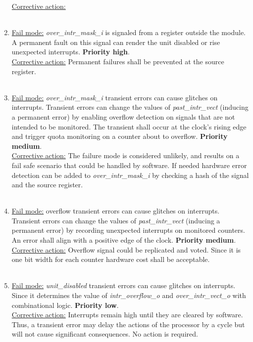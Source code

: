 \begin{enumerate}
\underline{Corrective action:}\\
\\
\item \underline{Fail mode:} \textit{over\_intr\_mask\_i} is signaled from a register outside the module. A permanent fault on this signal can render the unit disabled or rise unexpected interrupts. \textbf{ Priority high}.\\
\underline{Corrective action:} Permanent failures shall be prevented at the source register.\\
\\
\item \underline{Fail mode:} \textit{over\_intr\_mask\_i}  transient errors can cause glitches on interrupts. Transient errors can change the values of \textit{past\_intr\_vect} (inducing a permanent error) by enabling overflow detection on signals that are not intended to be monitored. The transient shall occur at the clock's rising edge and trigger quota monitoring on a counter about to overflow. \textbf{Priority medium}.\\
\underline{Corrective action:} The failure mode is considered unlikely, and results on a fail safe scenario that could be handled by software. If needed hardware error detection can be added to \textit{over\_intr\_mask\_i} by checking a hash of the signal and the source register.\\
\\
\item \underline{Fail mode:} overflow transient errors can cause glitches on interrupts. Transient errors can change the values of\textit{ past\_intr\_vect} (inducing a permanent error) by recording unexpected interrupts on monitored counters. An error shall align with a positive edge of the clock. \textbf{Priority medium}.\\
\underline{Corrective action:} Overflow signal could be replicated and voted. Since it is one bit width for each counter hardware cost shall be acceptable.\\
\\
\item \underline{Fail mode:} \textit{unit\_disabled} transient errors can cause glitches on interrupts. Since it determines the value of \textit{intr\_overflow\_o} and \textit{over\_intr\_vect\_o} with combinational logic. \textbf{Priority low}.\\
\underline{Corrective action:} Interrupts remain high until they are cleared by software. Thus, a transient error may delay the actions of the processor by a cycle but will not cause significant consequences. No action is required.\\

\end{enumerate}
